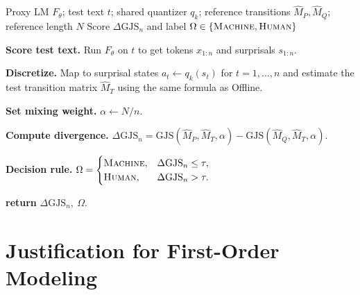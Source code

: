 \documentclass{article}
\theoremstyle{plain}
\theoremstyle{definition}
\theoremstyle{remark}
\begin{document}
\begin{algorithm}[h]
\caption{SurpMark (Online): Decision via GJS score against References}
\label{alg:surpmark-online}
\begin{algorithmic}[1]
\REQUIRE Proxy LM $F_\theta$; test text $t$; shared quantizer $q_k$; reference transitions $\hat M_P,\hat M_Q$; reference length $N$
\ENSURE Score $\Delta\mathrm{GJS}_n$ and label $\Omega\in\{\textsc{Machine},\textsc{Human}\}$

\STATE \textbf{Score test text.}
Run $F_\theta$ on $t$ to get tokens $x_{1:n}$ and surprisals $s_{1:n}$.

\STATE \textbf{Discretize.}
Map to surprisal states $a_t \leftarrow q_k(s_t)$ for $t=1,\dots,n$ and estimate the test transition matrix $\hat M_T$ using the same formula as Offline.

\STATE \textbf{Set mixing weight.}
$\alpha \leftarrow N/n$.

\STATE \textbf{Compute divergence.}
\STATE \quad $\displaystyle
\Delta\mathrm{GJS}_n
= \mathrm{GJS}(\hat M_P,\hat M_T,\alpha)
- \mathrm{GJS}(\hat M_Q,\hat M_T,\alpha).
$

\STATE \textbf{Decision rule.}
\STATE \quad $\displaystyle
\Omega =
\begin{cases}
\textsc{Machine}, & \Delta\mathrm{GJS}_n \le \tau,\\
\textsc{Human}, & \Delta\mathrm{GJS}_n > \tau.
\end{cases}
$

\STATE \textbf{return} $\Delta\mathrm{GJS}_n,\ \Omega$.
\end{algorithmic}
\end{algorithm}




\section{Justification for First-Order Modeling} \label{sec:empirical-finding-for-FO}
\end{document}
